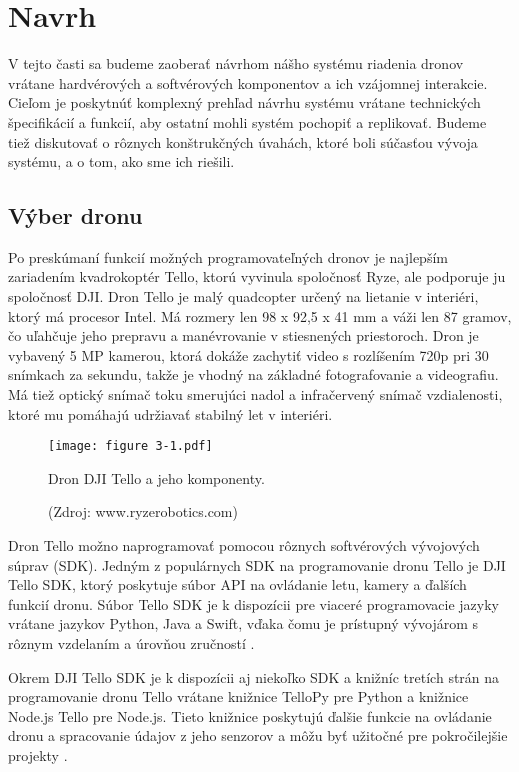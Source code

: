 \section{Navrh}
V tejto časti sa budeme zaoberať návrhom nášho systému riadenia dronov vrátane hardvérových a softvérových komponentov a ich vzájomnej interakcie. Cieľom je poskytnúť komplexný prehľad návrhu systému vrátane technických špecifikácií a funkcií, aby ostatní mohli systém pochopiť a replikovať. Budeme tiež diskutovať o rôznych konštrukčných úvahách, ktoré boli súčasťou vývoja systému, a o tom, ako sme ich riešili.

\subsection{Výber dronu}
Po preskúmaní funkcií možných programovateľných dronov je najlepším zariadením kvadrokoptér Tello, ktorú vyvinula spoločnosť Ryze, ale podporuje ju spoločnosť DJI. Dron Tello je malý quadcopter určený na lietanie v interiéri, ktorý má procesor Intel. Má rozmery len 98 x 92,5 x 41 mm a váži len 87 gramov, čo uľahčuje jeho prepravu a manévrovanie v stiesnených priestoroch. Dron je vybavený 5 MP kamerou, ktorá dokáže zachytiť video s rozlíšením 720p pri 30 snímkach za sekundu, takže je vhodný na základné fotografovanie a videografiu. Má tiež optický snímač toku smerujúci nadol a infračervený snímač vzdialenosti, ktoré mu pomáhajú udržiavať stabilný let v interiéri.

\begin{figure}[ht!]
    \centering
    \texttt{[image: figure 3-1.pdf]}
    \caption{Dron DJI Tello a jeho komponenty.}
    \captionsetup{font=footnotesize, justification=centering, skip=5pt}
    \caption*{(Zdroj: www.ryzerobotics.com)}
    \label{o:3-1}
\end{figure} 

Dron Tello možno naprogramovať pomocou rôznych softvérových vývojových súprav (SDK). Jedným z populárnych SDK na programovanie dronu Tello je DJI Tello SDK, ktorý poskytuje súbor API na ovládanie letu, kamery a ďalších funkcií dronu. Súbor Tello SDK je k dispozícii pre viaceré programovacie jazyky vrátane jazykov Python, Java a Swift, vďaka čomu je prístupný vývojárom s rôznym vzdelaním a úrovňou zručností \citep{TelloSDK}.

Okrem DJI Tello SDK je k dispozícii aj niekoľko SDK a knižníc tretích strán na programovanie dronu Tello vrátane knižnice TelloPy pre Python a knižnice Node.js Tello pre Node.js. Tieto knižnice poskytujú ďalšie funkcie na ovládanie dronu a spracovanie údajov z jeho senzorov a môžu byť užitočné pre pokročilejšie projekty .


